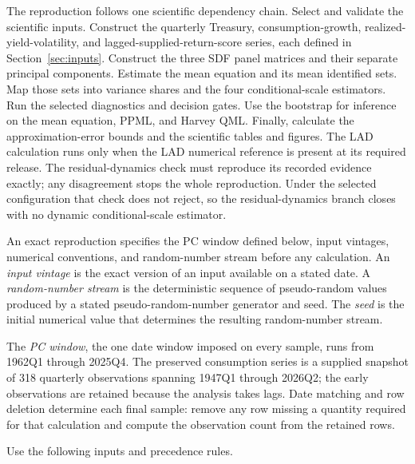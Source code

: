 \documentclass[11pt]{article}
\begin{document}
The reproduction follows one scientific dependency chain. Select and validate the scientific inputs.
Construct the quarterly Treasury, consumption-growth, realized-yield-volatility, and
lagged-supplied-return-score series, each defined in Section~\ref{sec:inputs}. Construct the three SDF panel matrices and their separate principal components. Estimate the
mean equation and its mean identified sets. Map those sets into variance shares and the four
conditional-scale estimators. Run the selected diagnostics and decision gates. Use the bootstrap for
inference on the mean equation, PPML, and Harvey QML. Finally, calculate the approximation-error
bounds and the scientific tables and figures. The LAD calculation runs only when the LAD
numerical reference is present at its required release. The residual-dynamics check
must reproduce its recorded evidence exactly; any disagreement stops the whole reproduction. Under
the selected configuration that check does not reject, so the residual-dynamics branch closes with
no dynamic conditional-scale estimator.

An exact reproduction specifies the PC window defined below, input vintages, numerical conventions,
and random-number stream before any calculation. An \emph{input vintage} is the exact version of an
input available on a stated date. A \emph{random-number stream} is the deterministic sequence
of pseudo-random values produced by a stated pseudo-random-number generator and seed. The
\emph{seed} is the initial numerical value that determines the resulting random-number stream.

The \emph{PC window}, the one date window imposed on every sample, runs from 1962Q1 through 2025Q4.
The preserved consumption series is a supplied snapshot of 318 quarterly observations spanning 1947Q1
through 2026Q2; the early observations are retained because the analysis takes lags. Date matching and row deletion determine each final sample: remove any row
missing a quantity required for that calculation and compute the observation count from the retained rows.

Use the following inputs and precedence rules.
\end{document}
